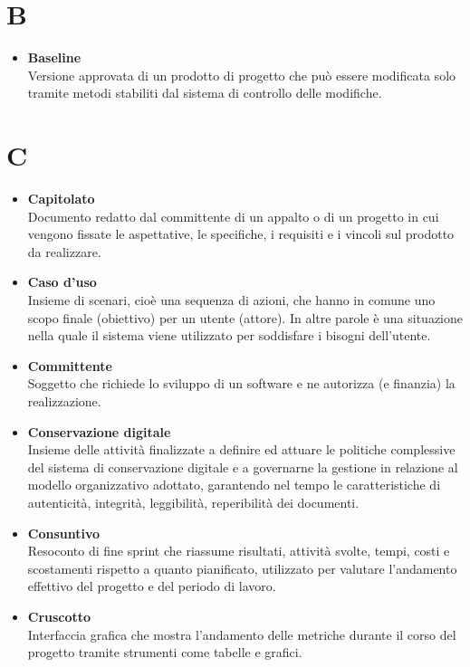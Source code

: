 \documentclass[a4paper,12pt]{article}
\begin{document}
        \section*{B} {
            \begin{itemize}
                \item \textbf{Baseline}\\
                    Versione approvata di un prodotto di progetto che può essere modificata solo tramite metodi stabiliti dal sistema di controllo delle modifiche.
            \end{itemize}
        }
        \newpage

        \section*{C} {
            \begin{itemize}
                \item \textbf{Capitolato}\\
                    Documento redatto dal committente di un appalto o di un progetto in cui vengono fissate le aspettative, le specifiche, i requisiti e i vincoli sul prodotto da realizzare.
                \item \textbf{Caso d'uso}\\
                    Insieme di scenari, cioè una sequenza di azioni, che hanno in comune uno scopo finale (obiettivo) per un utente (attore). In altre parole è una situazione nella quale il sistema viene utilizzato per soddisfare i bisogni dell'utente.
                \item \textbf{Committente}\\
                    Soggetto che richiede lo sviluppo di un software e ne autorizza (e finanzia) la realizzazione.
                \item \textbf{Conservazione digitale}\\
                    Insieme delle attività finalizzate a definire ed attuare le politiche complessive del sistema di conservazione digitale e a governarne la gestione in relazione al modello organizzativo adottato, garantendo nel tempo le caratteristiche di autenticità, integrità, leggibilità, reperibilità dei documenti.
                \item \textbf{Consuntivo}\\
                    Resoconto di fine sprint che riassume risultati, attività svolte, tempi, costi e scostamenti rispetto a quanto pianificato, utilizzato per valutare l'andamento effettivo del progetto e del periodo di lavoro.
                \item \textbf{Cruscotto}\\
                    Interfaccia grafica che mostra l'andamento delle metriche durante il corso del progetto tramite strumenti come tabelle e grafici.
            \end{itemize}
        }
        \newpage
\end{document}

